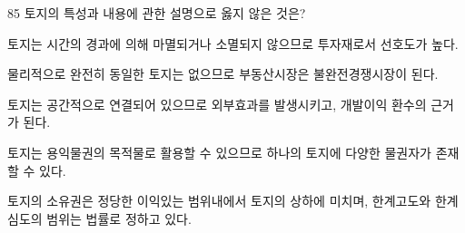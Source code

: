 \begin{question}{85}
토지의 특성과 내용에 관한 설명으로 옳지 않은 것은?
\begin{choices}
  \item 토지는 시간의 경과에 의해 마멸되거나 소멸되지 않으므로 투자재로서 선호도가 높다.
  \item 물리적으로 완전히 동일한 토지는 없으므로 부동산시장은 불완전경쟁시장이 된다.
  \item 토지는 공간적으로 연결되어 있으므로 외부효과를 발생시키고, 개발이익 환수의 근거가 된다.
  \item 토지는 용익물권의 목적물로 활용할 수 있으므로 하나의 토지에 다양한 물권자가 존재할 수 있다.
  \item 토지의 소유권은 정당한 이익있는 범위내에서 토지의 상하에 미치며, 한계고도와 한계심도의 범위는 법률로 정하고 있다.
\end{choices}
\end{question}
